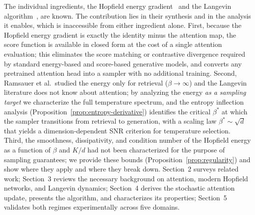 The individual ingredients, the Hopfield energy gradient~\cite{ramsauerHopfieldNetworksAll2021} and the Langevin algorithm~\cite{robertsTweedieExponentialConvergence1996}, are known. The contribution lies in their synthesis and in the analysis it enables, which is inaccessible from either ingredient alone. First, because the Hopfield energy gradient is exactly the identity minus the attention map, the score function is available in closed form at the cost of a single attention evaluation; this eliminates the score matching or contrastive divergence required by standard energy-based and score-based generative models, and converts any pretrained attention head into a sampler with no additional training. Second, Ramsauer et al.\ studied the energy only for retrieval ($\beta\to\infty$) and the Langevin literature does not know about attention; by analyzing the energy \emph{as a sampling target} we characterize the full temperature spectrum, and the entropy inflection analysis (Proposition~\ref{prop:entropy-derivative}) identifies the critical $\beta^*$ at which the sampler transitions from retrieval to generation, with a scaling law $\beta^*\sim\sqrt{d}$ that yields a dimension-dependent SNR criterion for temperature selection. Third, the smoothness, dissipativity, and condition number of the Hopfield energy as a function of $\beta$ and $K/d$ had not been characterized for the purpose of sampling guarantees; we provide these bounds (Proposition~\ref{prop:regularity}) and show where they apply and where they break down. Section~2 surveys related work; Section~3 reviews the necessary background on attention, modern Hopfield networks, and Langevin dynamics; Section~4 derives the stochastic attention update, presents the algorithm, and characterizes its properties; Section~5 validates both regimes experimentally across five domains.
